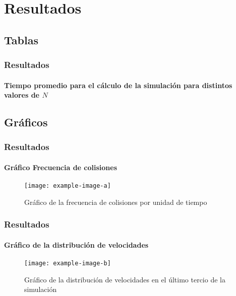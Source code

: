 \documentclass[hyperref={pdfpagelayout=SinglePage}]{beamer}
\begin{document}
\section{Resultados}

\subsection{Tablas}

\begin{frame}
\frametitle{Resultados}
\framesubtitle{Tiempo promedio para el cálculo de la simulación para distintos valores de $N$}
\begin{center}
\begin{table}[h]
\centering
{}
\caption{Tiempo promedio para el cálculo de la simulación para distintos valores de $N$.}
\end{table}
\end{center}
\end{frame}

\subsection{Gráficos}

\begin{frame}
\frametitle{Resultados}
\framesubtitle{Gráfico Frecuencia de colisiones}
\begin{figure}[H]
        \centering
        \texttt{[image: example-image-a]}
        \caption{Gráfico de la frecuencia de colisiones por unidad de tiempo}
\end{figure}
\end{frame}

\begin{frame}
\frametitle{Resultados}
\framesubtitle{Gráfico de la distribución de velocidades}
\begin{figure}[H]
        \centering
        \texttt{[image: example-image-b]}
        \caption{Gráfico de la distribución de velocidades en el último tercio de la simulación}
\end{figure}
\end{frame}
\end{document}
